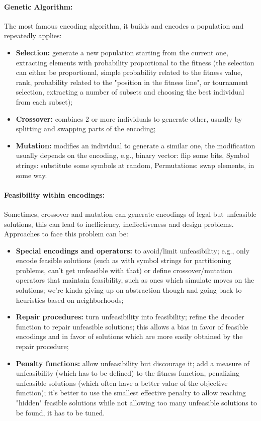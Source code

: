 \documentclass{article}
\begin{document}
	\paragraph{Genetic Algorithm:} The most famous encoding algorithm, it builds and encodes a population and repeatedly applies: 
	\begin{itemize}
		\item \textbf{Selection:} generate a new population starting from the current one, extracting elements with probability proportional to the fitness (the selection can either be proportional, simple probability related to the fitness value, rank, probability related to the "position in the fitness line", or tournament selection, extracting a number of subsets and choosing the best individual from each subset);
		\item \textbf{Crossover:} combines 2 or more individuals to generate other, usually by splitting and swapping parts of the encoding;
		\item \textbf{Mutation:} modifies an individual to generate a similar one, the modification usually depends on the encoding, e.g., binary vector: flip some bits, Symbol strings: substitute some symbols at random, Permutations: swap elements, in some way. \\
	\end{itemize}
	
	\paragraph{Feasibility within encodings:} Sometimes, crossover and mutation can generate encodings of legal but unfeasible solutions, this can lead to inefficiency, ineffectiveness and design problems. Approaches to face this problem can be: 
	\begin{itemize}
		\item \textbf{Special encodings and operators:} to avoid/limit unfeasibility; e.g., only encode feasible solutions (such as with symbol strings for partitioning problems, can't get unfeasible with that) or define crossover/mutation operators that maintain feasibility, such as ones which simulate moves on the solutions; we're kinda giving up on abstraction though and going back to heuristics based on neighborhoods;
		\item \textbf{Repair procedures:} turn unfeasibility into feasibility; refine the decoder function to repair unfeasible solutions; this allows a bias in favor of feasible encodings and in favor of solutions which are more easily obtained by the repair procedure;
		\item \textbf{Penalty functions:} allow unfeasibility but discourage it; add a measure of unfeasibility (which has to be defined) to the fitness function, penalizing unfeasible solutions (which often have a better value of the objective function); it's better to use the smallest effective penalty to allow reaching "hidden" feasible solutions while not allowing too many unfeasible solutions to be found, it has to be tuned.\\
	\end{itemize}
	
\end{document}
